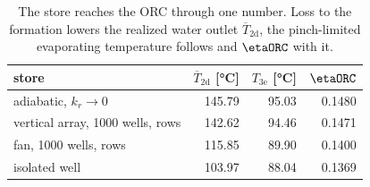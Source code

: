 \begin{table}[htbp]
\centering
\caption{The store reaches the ORC through one number. Loss to the formation lowers the realized water outlet $\overline{T}_\mathrm{2d}$, the pinch-limited evaporating temperature follows and $\etaORC$ with it.}
\label{tab:T3e}
\small
\begin{tabular}{@{}l r r r@{}}
\toprule
store & $\overline{T}_\mathrm{2d}$ [\si{\celsius}] & $T_\mathrm{3e}$ [\si{\celsius}] & $\etaORC$ \\
\midrule
adiabatic, $k_r\to0$ & 145.79 & 95.03 & 0.1480 \\
vertical array, 1000 wells, rows & 142.62 & 94.46 & 0.1471 \\
fan, 1000 wells, rows & 115.85 & 89.90 & 0.1400 \\
isolated well & 103.97 & 88.04 & 0.1369 \\
\bottomrule
\end{tabular}
\end{table}
